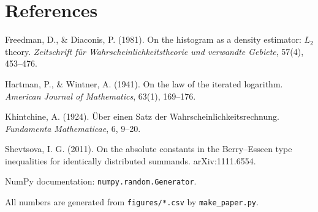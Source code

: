 \documentclass[11pt,a4paper]{article}
\begin{document}
\section*{References}
{\small
\setlength{\parskip}{2pt}
\hangindent=1.27cm Freedman, D., \& Diaconis, P. (1981). On the histogram as a density estimator: $L_2$ theory. \textit{Zeitschrift für
Wahrscheinlichkeitstheorie und verwandte Gebiete}, 57(4), 453--476.\par
\hangindent=1.27cm Hartman, P., \& Wintner, A. (1941). On the law of the iterated logarithm. \textit{American Journal of Mathematics}, 63(1), 169--176.\par
\hangindent=1.27cm Khintchine, A. (1924). Über einen Satz der Wahrscheinlichkeitsrechnung. \textit{Fundamenta Mathematicae}, 6, 9--20.\par
\hangindent=1.27cm Shevtsova, I. G. (2011). On the absolute constants in the Berry--Esseen type inequalities for identically distributed summands.
arXiv:1111.6554.\par
\hangindent=1.27cm NumPy documentation: \texttt{numpy.random.Generator}.\par

\smallskip
All numbers are generated from
\texttt{figures/*.csv} by \texttt{make\_paper.py}.
}
\end{document}
